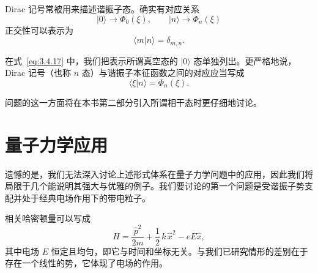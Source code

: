 Dirac 记号常被用来描述谐振子态。确实有对应关系
\begin{equation}
|0\rangle\to\Phi_0(\xi),\qquad
|n\rangle\to\Phi_n(\xi)
\label{eq:3.4.17}
\end{equation}
正交性可以表示为
\begin{equation}
\langle m|n\rangle=\delta_{m,n}.
\label{eq:3.4.18}
\end{equation}

在式~\eqref{eq:3.4.17} 中，我们把表示所谓真空态的 $|0\rangle$ 态单独列出。更严格地说，Dirac 记号（也称 $n$ 态）与谐振子本征函数之间的对应应当写成
\begin{equation}
\langle \xi|n\rangle=\Phi_n(\xi).
\label{eq:3.4.19}
\end{equation}

问题的这一方面将在本书第二部分引入所谓相干态时更仔细地讨论。

\section{量子力学应用}
\label{sec:3.5}

遗憾的是，我们无法深入讨论上述形式体系在量子力学问题中的应用，因此我们将局限于几个能说明其强大与优雅的例子。我们要讨论的第一个问题是受谐振子势支配并处于经典电场作用下的带电粒子。

相关哈密顿量可以写成
\begin{equation}
\hat H=\frac{\hat p^2}{2m}+\frac{1}{2}\,k\,\hat x^2-eE\hat x,
\label{eq:3.5.1}
\end{equation}
其中电场 $E$ 恒定且均匀，即它与时间和坐标无关。与我们已研究情形的差别在于存在一个线性的势，它体现了电场的作用。

